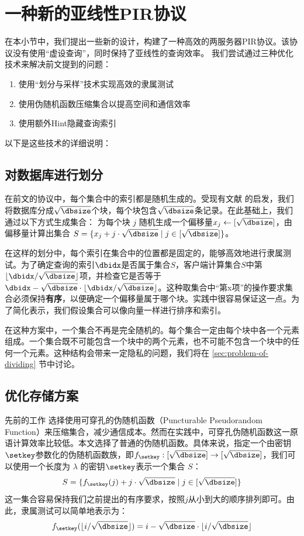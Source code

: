 \section{一种新的亚线性PIR协议}
\label{sec:construction}
在本小节中，我们提出一些新的设计，构建了一种高效的两服务器PIR协议。该协议没有使用“虚设查询”，同时保持了亚线性的查询效率。
我们尝试通过三种优化技术来解决前文提到的问题：
\begin{enumerate}
    \item 使用“划分与采样”技术实现高效的隶属测试
    \item 使用伪随机函数压缩集合以提高空间和通信效率
    \item 使用额外Hint隐藏查询索引
\end{enumerate}
以下是这些技术的详细说明：
\subsection{对数据库进行划分}

在前文的协议中，每个集合中的索引都是随机生成的。受现有文献 \cite{Piano, C:LazPap23} 的启发，我们将数据库分成$\sqrt{\dbsize}$个块，每个块包含$\sqrt{\dbsize}$条记录。在此基础上，我们通过以下方式生成集合：
为每个块 $j$ 随机生成一个偏移量$x_j \leftarrow [\sqrt{\dbsize}]$，由偏移量计算出集合 $S=\{x_j+j\cdot \sqrt{\dbsize} \mid j \in [\sqrt{\dbsize}]\}$。

在这样的划分中，每个索引在集合中的位置都是固定的，能够高效地进行隶属测试。为了确定查询的索引$\dbidx$是否属于集合$S$，客户端计算集合$S$中第$\lfloor \dbidx/\sqrt{\dbsize}\rfloor$项，并检查它是否等于$\dbidx-\sqrt{\dbsize}\cdot\lfloor \dbidx/\sqrt{\dbsize}\rfloor$。这种取集合中“第x项”的操作要求集合必须保持\textbf{有序}，以便确定一个偏移量属于哪个块。实践中很容易保证这一点。为了简化表示，我们假设集合可以像向量一样进行排序和索引。

在这种方案中，一个集合不再是完全随机的。每个集合一定由每个块中各一个元素组成。一个集合既不可能包含一个块中的两个元素，也不可能不包含一个块中的任何一个元素。这种结构会带来一定隐私的问题，我们将在 \ref{sec:problem-of-dividing} 节中讨论。


\subsection{优化存储方案}
先前的工作\cite{EC:CorKog20, C:LazPap23} 选择使用可穿孔的伪随机函数（Puncturable Pseudorandom Function）来压缩集合，减少通信成本。然而在实践中，可穿孔伪随机函数这一原语计算效率比较低。本文选择了普通的伪随机函数。具体来说，指定一个由密钥$\setkey$参数化的伪随机函数族，即$f_{\setkey}: [\sqrt{\dbsize}] \to [\sqrt{\dbsize}]$，我们可以使用一个长度为 $\lambda$ 的密钥$\setkey$表示一个集合 $S$：
$$S = \{f_{\setkey}(j) + j \cdot \sqrt{\dbsize} \mid j \in [\sqrt{\dbsize}]\}$$
这一集合容易保持我们之前提出的有序要求，按照$j$从小到大的顺序排列即可。由此，隶属测试可以简单地表示为：
$$f_{\setkey}(\lfloor i/\sqrt{\dbsize}\rfloor) = i - \sqrt{\dbsize}\cdot\lfloor i/\sqrt{\dbsize}\rfloor$$

